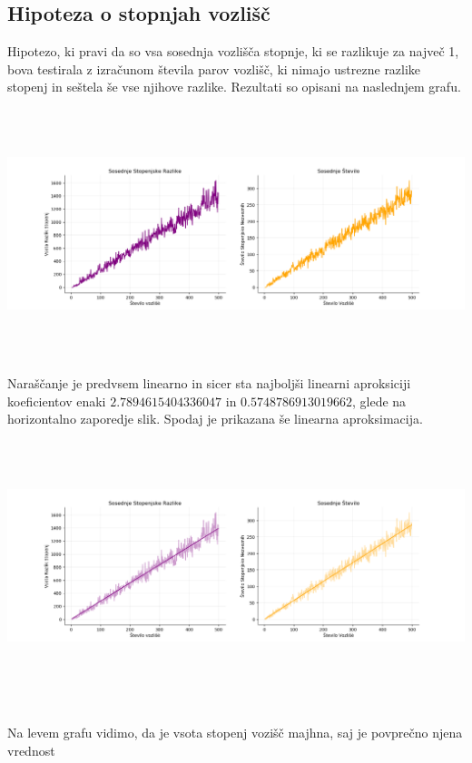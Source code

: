 \documentclass[ letterpaper, titlepage, fleqn]{article}
\begin{document}
\subsection{Hipoteza o stopnjah vozlišč}
Hipotezo, ki pravi da so vsa sosednja vozlišča stopnje, ki se razlikuje za največ 1, bova testirala
z izračunom števila parov vozlišč, ki nimajo ustrezne razlike stopenj in seštela še vse njihove razlike.
Rezultati so opisani na naslednjem grafu.\\
\includegraphics[width=\textwidth, height=8cm]{graphics/degree_difference.png}\\
Naraščanje je predvsem linearno in sicer sta najboljši linearni aproksiciji koeficientov enaki
$2.7894615404336047$ in $0.5748786913019662$, glede na horizontalno zaporedje slik.
Spodaj je prikazana še linearna aproksimacija. \\
\includegraphics[width=\textwidth, height=8cm]{graphics/degree_difference_linear_aproximation.png}\\
\\
Na levem grafu vidimo, da je vsota stopenj vozišč majhna, saj je povprečno njena vrednost
\end{document}
